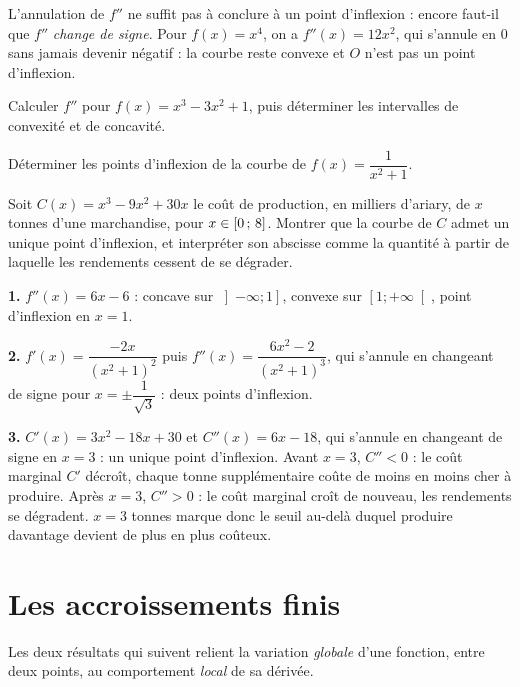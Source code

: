 \begin{erreurclassique}
L'annulation de $f''$ ne suffit pas à conclure à un point d'inflexion : encore
faut-il que $f''$ \emph{change de signe}. Pour $f(x) = x^{4}$, on a
$f''(x) = 12x^{2}$, qui s'annule en $0$ sans jamais devenir négatif : la
courbe reste convexe et $O$ n'est pas un point d'inflexion.
\end{erreurclassique}

\begin{entrainement}[concavité]
\exo[\niveau{1}] Calculer $f''$ pour $f(x) = x^{3}-3x^{2}+1$, puis déterminer
les intervalles de convexité et de concavité.

\exo[\niveau{2}] Déterminer les points d'inflexion de la courbe de
$f(x) = \dfrac{1}{x^{2}+1}$.

\exo[\niveau{3}] Soit $C(x) = x^{3}-9x^{2}+30x$ le coût de production, en
milliers d'ariary, de $x$ tonnes d'une marchandise, pour $x \in \left[0\,;\,8\right]$.
Montrer que la courbe de $C$ admet un unique point d'inflexion, et interpréter
son abscisse comme la quantité à partir de laquelle les rendements cessent de
se dégrader.
\end{entrainement}

\begin{corrige}
\textbf{1.} $f''(x) = 6x-6$ : concave sur $\left]-\infty ; 1\right]$, convexe
sur $\left[1 ; +\infty\right[$, point d'inflexion en $x=1$.

\textbf{2.} $f'(x) = \dfrac{-2x}{(x^{2}+1)^{2}}$ puis
$f''(x) = \dfrac{6x^{2}-2}{(x^{2}+1)^{3}}$, qui s'annule en changeant de signe
pour $x = \pm\dfrac{1}{\sqrt{3}}$ : deux points d'inflexion.

\textbf{3.} $C'(x) = 3x^{2}-18x+30$ et $C''(x) = 6x-18$, qui s'annule en
changeant de signe en $x=3$ : un unique point d'inflexion. Avant $x=3$,
$C'' < 0$ : le coût marginal $C'$ décroît, chaque tonne supplémentaire coûte
de moins en moins cher à produire. Après $x=3$, $C''>0$ : le coût marginal
croît de nouveau, les rendements se dégradent. $x=3$ tonnes marque donc le
seuil au-delà duquel produire davantage devient de plus en plus coûteux.
\end{corrige}

\section{Les accroissements finis}

Les deux résultats qui suivent relient la variation \emph{globale} d'une
fonction, entre deux points, au comportement \emph{local} de sa dérivée.

